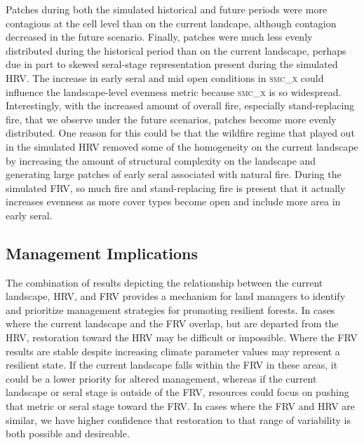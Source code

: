 \documentclass[12pt]{article}
\begin{document}
\begin{spacing}{1}
Patches during both the simulated historical and future periods were more contagious at the cell level than on the current landcape, although contagion decreased in the future scenario. Finally, patches were much less evenly distributed during the historical period than on the current landscape, perhaps due in part to skewed seral-stage representation present during the simulated HRV. The increase in early seral and mid open conditions in \textsc{smc\_x} could influence the landscape-level evenness metric because \textsc{smc\_x} is so widespread. Interestingly, with the increased amount of overall fire, especially stand-replacing fire, that we observe under the future scenarios, patches become more evenly distributed. One reason for this could be that the wildfire regime that played out in the simulated HRV removed some of the homogeneity on the current landscape by increasing the amount of structural complexity on the landscape and generating large patches of early seral associated with natural fire. During the simulated FRV, so much fire and stand-replacing fire is present that it actually increases evenness as more cover types become open and include more area in early seral.

\subsection*{Management Implications}

The combination of results depicting the relationship between the current landscape, HRV, and FRV provides a mechanism for land managers to identify and prioritize management strategies for promoting resilient forests. In cases where the current landscape and the FRV overlap, but are departed from the HRV, restoration toward the HRV may be difficult or impossible. Where the FRV results are stable despite increasing climate parameter values may represent a resilient state. If the current landscape falls within the FRV in these areas, it could be a lower priority for altered management, whereas if the current landscape or seral stage is outside of the FRV, resources could focus on pushing that metric or seral stage toward the FRV. In cases where the FRV and HRV are similar, we have higher confidence that restoration to that range of variability is both possible and desireable.


\end{spacing}
\end{document}
